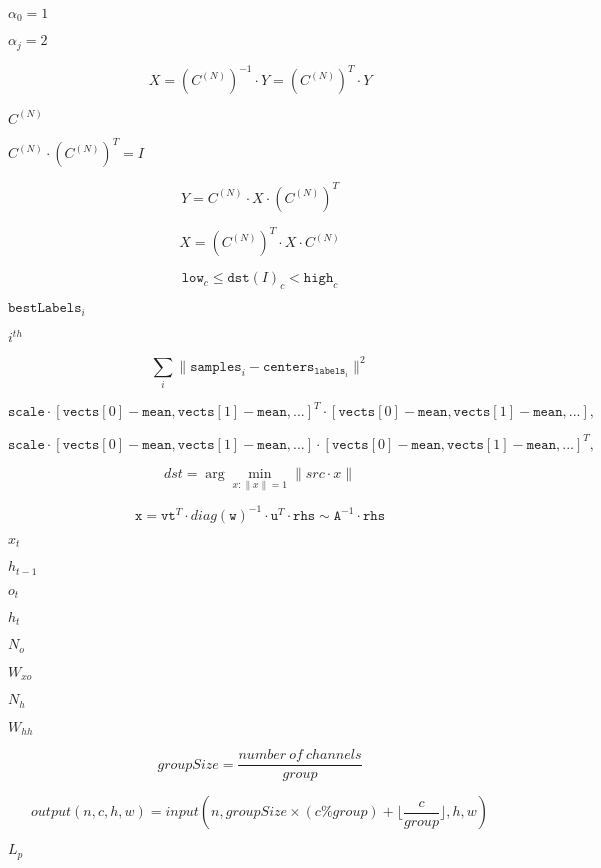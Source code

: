 \documentclass{article}
\begin{document}
$\alpha_0=1$
\pagebreak

$\alpha_j=2$
\pagebreak

\[X = \left (C^{(N)} \right )^{-1} \cdot Y = \left (C^{(N)} \right )^T \cdot Y\]
\pagebreak

$C^{(N)}$
\pagebreak

$C^{(N)} \cdot \left(C^{(N)}\right)^T = I$
\pagebreak

\[Y = C^{(N)} \cdot X \cdot \left (C^{(N)} \right )^T\]
\pagebreak

\[X = \left (C^{(N)} \right )^T \cdot X \cdot C^{(N)}\]
\pagebreak

\[\texttt{low} _c \leq \texttt{dst} (I)_c < \texttt{high} _c\]
\pagebreak

$\texttt{bestLabels}_i$
\pagebreak

$i^{th}$
\pagebreak

\[\sum _i \| \texttt{samples} _i - \texttt{centers} _{ \texttt{labels} _i} \| ^2\]
\pagebreak

\[\texttt{scale} \cdot [ \texttt{vects} [0]- \texttt{mean} , \texttt{vects} [1]- \texttt{mean} ,...]^T \cdot [ \texttt{vects} [0]- \texttt{mean} , \texttt{vects} [1]- \texttt{mean} ,...],\]
\pagebreak

\[\texttt{scale} \cdot [ \texttt{vects} [0]- \texttt{mean} , \texttt{vects} [1]- \texttt{mean} ,...] \cdot [ \texttt{vects} [0]- \texttt{mean} , \texttt{vects} [1]- \texttt{mean} ,...]^T,\]
\pagebreak

\[dst = \arg \min _{x: \| x \| =1} \| src \cdot x \|\]
\pagebreak

\[\texttt{x} = \texttt{vt} ^T \cdot diag( \texttt{w} )^{-1} \cdot \texttt{u} ^T \cdot \texttt{rhs} \sim \texttt{A} ^{-1} \cdot \texttt{rhs}\]
\pagebreak

$x_t$
\pagebreak

$h_{t-1}$
\pagebreak

$o_t$
\pagebreak

$h_t$
\pagebreak

$N_o$
\pagebreak

$ W_{xo} $
\pagebreak

$N_h$
\pagebreak

$ W_{hh} $
\pagebreak

\[ groupSize = \frac{number\ of\ channels}{group} \]
\pagebreak

\[ output(n, c, h, w) = input(n, groupSize \times (c \% group) + \lfloor \frac{c}{group} \rfloor, h, w) \]
\pagebreak

$ L_p $
\pagebreak
\end{document}
